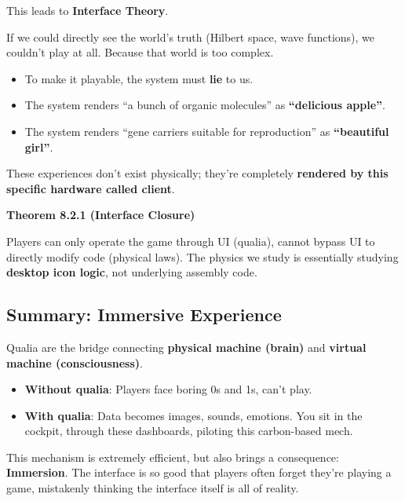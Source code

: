 This leads to \textbf{Interface Theory}.

If we could directly see the world's truth (Hilbert space, wave functions), we couldn't play at all. Because that world is too complex.
\begin{itemize}
\item To make it playable, the system must \textbf{lie} to us.
\item The system renders ``a bunch of organic molecules'' as \textbf{``delicious apple''}.
\item The system renders ``gene carriers suitable for reproduction'' as \textbf{``beautiful girl''}.
\end{itemize}

These experiences don't exist physically; they're completely \textbf{rendered by this specific hardware called client}.

\textbf{Theorem 8.2.1 (Interface Closure)}

Players can only operate the game through UI (qualia), cannot bypass UI to directly modify code (physical laws).
The physics we study is essentially studying \textbf{desktop icon logic}, not underlying assembly code.

\subsection{Summary: Immersive Experience}

Qualia are the bridge connecting \textbf{physical machine (brain)} and \textbf{virtual machine (consciousness)}.

\begin{itemize}
\item \textbf{Without qualia}: Players face boring 0s and 1s, can't play.
\item \textbf{With qualia}: Data becomes images, sounds, emotions. You sit in the cockpit, through these dashboards, piloting this carbon-based mech.
\end{itemize}

This mechanism is extremely efficient, but also brings a consequence: \textbf{Immersion}.
The interface is so good that players often forget they're playing a game, mistakenly thinking the interface itself is all of reality.
